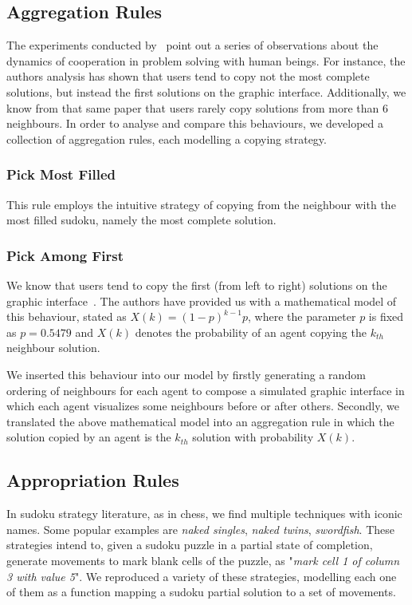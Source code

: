 \documentclass{article}
\begin{document}
\subsection{Aggregation Rules}

The experiments conducted by~\cite{farenzena:collabem} point out a series of observations about the dynamics of cooperation in problem solving with human beings. For instance, the authors analysis has shown that users tend to copy not the most complete solutions, but instead the first solutions on the graphic interface. Additionally, we know from that same paper that users rarely copy solutions from more than 6 neighbours. In order to analyse and compare this behaviours, we developed a collection of aggregation rules, each modelling a copying strategy.

\subsubsection{Pick Most Filled}

This rule employs the intuitive strategy of copying from the neighbour with the most filled sudoku, namely the most complete solution.

\subsubsection{Pick Among First}

We know that users tend to copy the first (from left to right) solutions on the graphic interface~\cite{farenzena:collabem}. The authors have provided us with a mathematical model of this behaviour, stated as $X(k) = (1-p)^{k-1}p$, where the parameter $p$ is fixed as $p = 0.5479$ and $X(k)$ denotes the probability of an agent copying the $k_{th}$ neighbour solution.

We inserted this behaviour into our model by firstly generating a random ordering of neighbours for each agent to compose a simulated graphic interface in which each agent visualizes some neighbours before or after others. Secondly, we translated the above mathematical model into an aggregation rule in which the solution copied by an agent is the $k_{th}$ solution with probability $X(k)$.

\subsection{Appropriation Rules}

In sudoku strategy literature, as in chess, we find multiple techniques with iconic names. Some popular examples are {\em naked singles}, {\em naked twins}, {\em swordfish}. These strategies intend to, given a sudoku puzzle in a partial state of completion, generate movements to mark blank cells of the puzzle, as "{\em mark cell 1 of column 3 with value 5}". We reproduced a variety of these strategies, modelling each one of them as a function mapping a sudoku partial solution to a set of movements.
\end{document}
